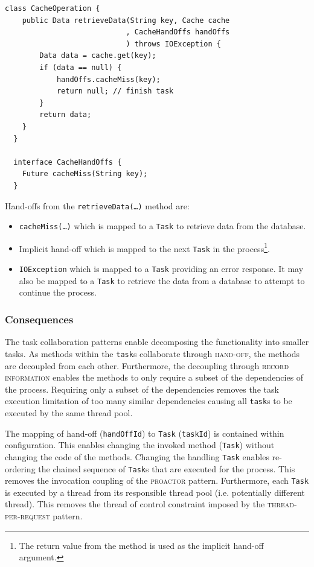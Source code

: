 \documentclass[prodmode]{style/acmlarge}
\begin{document}
\begin{lstlisting}[float,label=lst:Example_Method_Task]
  class CacheOperation {
    public Data retrieveData(String key, Cache cache
                            , CacheHandOffs handOffs
                            ) throws IOException {
        Data data = cache.get(key);
        if (data == null) {
            handOffs.cacheMiss(key);
            return null; // finish task
        }
        return data;
    }
  }

  interface CacheHandOffs {
    Future cacheMiss(String key);
  }
\end{lstlisting}

Hand-offs from the \texttt{retrieveData(\ldots)} method are:
\begin{itemize}
  \item \texttt{cacheMiss(\ldots)} which is mapped to a \texttt{Task} to retrieve data from the database.
  \item Implicit hand-off which is mapped to the next \texttt{Task} in the process\footnote{The return value from the method is used as the implicit hand-off argument.}.
  \item \texttt{IOException} which is mapped to a \texttt{Task} providing an error response.  It may also be mapped to a \texttt{Task} to retrieve the data from a database to attempt to continue the process.
\end{itemize}


\subsubsection*{Consequences}

The task collaboration patterns enable decomposing the functionality into
smaller tasks.  As methods within the \texttt{task}s collaborate through
\textsc{hand-off}, the methods are decoupled from each other.  Furthermore, the
decoupling through \textsc{record information} enables the methods to only
require a subset of the dependencies of the process.  Requiring only a subset of
the dependencies removes the task execution limitation of too many similar
dependencies causing all \texttt{task}s to be executed by the same thread pool.

The mapping of hand-off (\texttt{handOffId}) to \texttt{Task} (\texttt{taskId})
is contained within configuration.  This enables changing the invoked method
(\texttt{Task}) without changing the code of the methods.  Changing the handling
\texttt{Task} enables re-ordering the chained sequence of \texttt{Task}s that
are executed for the process.  This removes the invocation coupling of the
\textsc{proactor} pattern.  Furthermore, each \texttt{Task} is executed by a
thread from its responsible thread pool (i.e. potentially different thread). 
This removes the thread of control constraint imposed by the
\textsc{thread-per-request} pattern.
\end{document}
